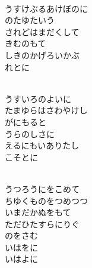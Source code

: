 \documentclass[10pt,b5j]{tarticle} %
\begin{document}
\begin{enumerate}
\begin{minipage}[c]{\blocksize}
        \vspace{\linespace}
        \item~\\
        うすけぶるあけぼのに\\
        のたゆたいう\\
        されどはまだくして\\
        きむのもて\\
        しきのかげろいかぶ\\
        れとに
        
    \end{minipage}
    \begin{minipage}[c]{\blocksize}
        
        \vspace{\linespace}
        \item~\\
        うすいろのよいに\\
        たまゆらはさわやけし\\
        がにもると\\
        うらのしさに\\
        えるにもいありたし\\
        こそとに
        
    \end{minipage}
    \begin{minipage}[c]{\blocksize}
        
        \vspace{\linespace}
        \item~\\
        うつろうにをこめて\\
        ちゆくものをつめつつ\\
        いまだかぬをもて\\
        ただひたすらにりぐ\\
        のをさむ\\
        いはをに\\
        いはよに
    
    \end{minipage}
\end{enumerate} %
\end{document}
